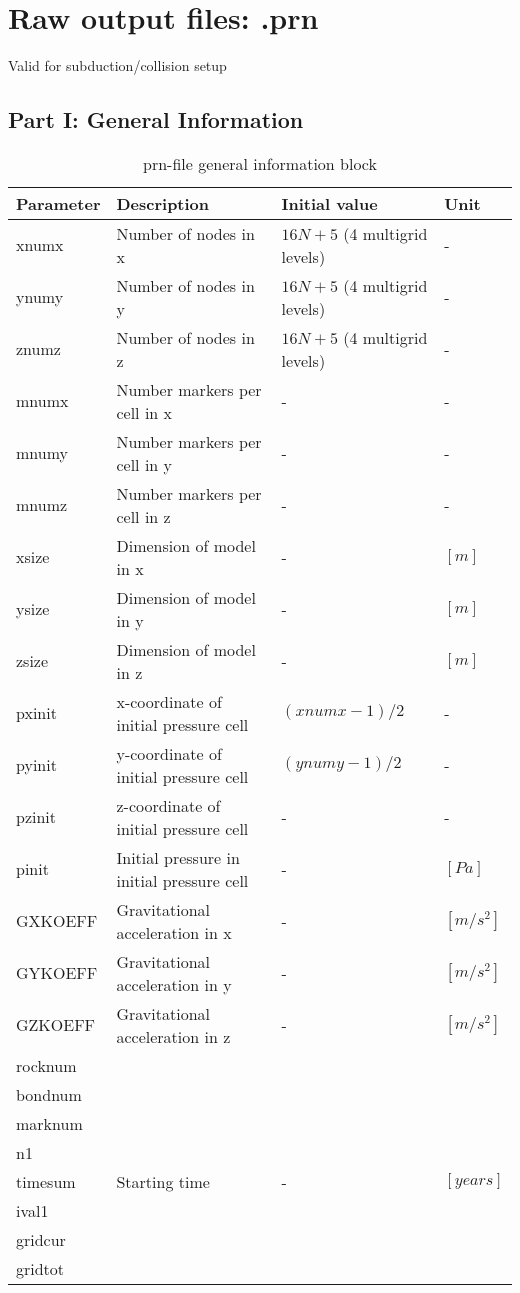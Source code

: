 
\section{Raw output files: .prn}
Valid for subduction/collision setup

\subsection{Part I: General Information}
\begin{table}[H]
\small
\centering
\begin{tabular}{p{3cm} p{6cm} p{3cm} l}
\toprule
Parameter & Description & Initial value & Unit\\
\midrule
xnumx & Number of nodes in x & $16N+5$ (4 multigrid levels) & - \\
ynumy & Number of nodes in y & $16N+5$ (4 multigrid levels) & - \\
znumz & Number of nodes in z & $16N+5$ (4 multigrid levels) & - \\
mnumx & Number markers per cell in x & - & - \\
mnumy & Number markers per cell in y & - & - \\
mnumz & Number markers per cell in z & - & - \\
xsize & Dimension of model in x & - & $[m]$ \\
ysize & Dimension of model in y & - & $[m]$ \\
zsize & Dimension of model in z & - & $[m]$ \\
pxinit & x-coordinate of initial pressure cell & $(xnumx-1)/2$ & - \\
pyinit & y-coordinate of initial pressure cell & $(ynumy-1)/2$ & - \\
pzinit & z-coordinate of initial pressure cell & - & - \\
pinit & Initial pressure in initial pressure cell & - & $[Pa]$ \\
GXKOEFF & Gravitational acceleration in x & - & $[m/s^2]$ \\
GYKOEFF & Gravitational acceleration in y & - & $[m/s^2]$ \\
GZKOEFF & Gravitational acceleration in z & - & $[m/s^2]$ \\
rocknum & \\
bondnum & \\
marknum & \\
n1 & \\
timesum & Starting time & - & $[years]$ \\
ival1 & \\
gridcur & \\
gridtot & \\
\bottomrule
\end{tabular}
\caption{prn-file general information block}
\label{tbl:prn_general_info}
\end{table}


